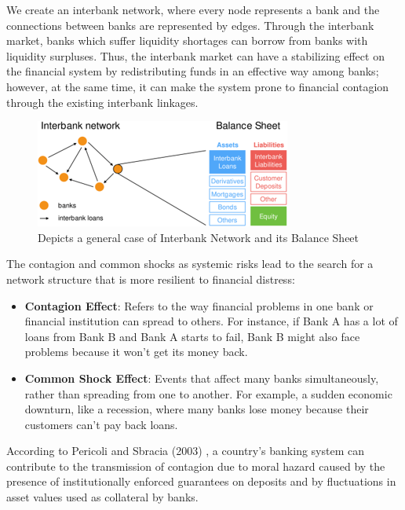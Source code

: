 \documentclass{article} %
\begin{document}
We create an interbank network, where every node represents a bank and the connections between banks are represented by edges. Through the interbank market, banks which suffer liquidity shortages can borrow from banks with liquidity surpluses. Thus, the interbank market can have a stabilizing effect on the financial system by redistributing funds in an effective way among banks; however, at the same time, it can make the system prone to financial contagion through the existing interbank linkages.

\begin{figure}[H]
    \centering
    \includegraphics[width=0.8\linewidth]{Figures/Figure_0.png}
    \caption{Depicts a general case of Interbank Network and its Balance Sheet}
    \label{fig:figure0}
\end{figure}

The contagion and common shocks as systemic risks lead to the search for a network structure that is more resilient to financial distress:

\begin{itemize}
    \item \textbf{Contagion Effect}: Refers to the way financial problems in one bank or financial institution can spread to others. For instance, if Bank A has a lot of loans from Bank B and Bank A starts to fail, Bank B might also face problems because it won’t get its money back.
    \item \textbf{Common Shock Effect}: Events that affect many banks simultaneously, rather than spreading from one to another. For example, a sudden economic downturn, like a recession, where many banks lose money because their customers can’t pay back loans.
\end{itemize}

According to Pericoli and Sbracia (2003) \cite{pericoli2003correlation}, a country’s banking system can contribute to the transmission of contagion due to moral hazard caused by the presence of institutionally enforced guarantees on deposits and by fluctuations in asset values used as collateral by banks.
\end{document}
